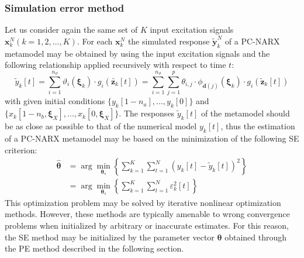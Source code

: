 \documentclass[preprint,3p,review,times,11pt]{elsarticle}
\newcommand{\beq}{\begin{equation}}
\newcommand{\eeq}{\end{equation}}
\newcommand{\bld}[1]{\boldsymbol{#1}}
\newcommand{\bth}{\bld{\theta}}
\newcommand{\bxi}{\bld{\xi}}
\begin{document}
\subsubsection{Simulation error method} \label{sec:SEestimation}
Let us consider again the same set of $K$ input excitation signals ${\bld x}_k^N (k = 1, 2, \ldots,K)$. For each ${\bld x}_k^N$ the simulated response $\tilde{\bld y}_k^N$ of a PC-NARX metamodel may be obtained by using the input excitation signals and the following relationship applied recursively with respect to time $t$:
\beq 
\tilde{y}_k[t] = \sum_{i=1}^{n_\vartheta} \vartheta_i (\bxi_k) \cdot g_i(\tilde{\bld z_k}[t]) = \sum_{i=1}^{n_\vartheta}\sum_{j=1}^{p}  \theta_{i,j} \cdot \phi_{\bld{d}(j)}(\bxi_k) \cdot g_i(\tilde{\bld z}_k[t]) \label{eq:ysim}
\eeq
with given initial conditions $\{ y_k[1 - n_a], \ldots, y_k[0] \}$ and $\{ x_k[1-n_b,\bxi_X], \ldots, x_k[0,\bxi_X]\}$. The responses $\tilde{y}_k[t]$ of the metamodel should be as close as possible to that of the numerical model $y_k[t]$, thus the estimation of a PC-NARX metamodel may be based on the minimization of the following SE criterion: 
\begin{align} \label{eq:SIMcrit} \hat{\bth} & = \arg\min_{\bth_s} \left\{ \sum_{k=1}^K \sum_{t=1}^N  (y_k[t]- \tilde{y}_k[t] )^2 \right\} \nonumber \\
&= \arg\min_{\bth_s} \left\{ \sum_{k=1}^K \sum_{t=1}^N  \varepsilon_k^2[t] \right\}
\end{align}
This optimization problem may be solved by iterative nonlinear optimization methods. However, these methods are typically amenable to wrong convergence problems when initialized by arbitrary or inaccurate estimates. For this reason, the SE method may be initialized by the parameter vector $\bth$ obtained through the PE method described in the following section.

\end{document}
